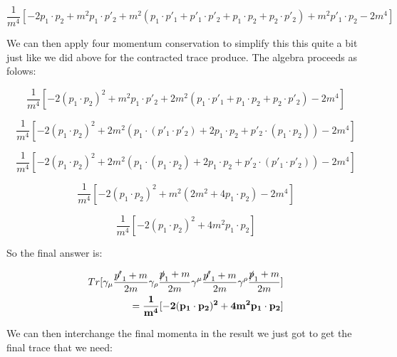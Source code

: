 \documentclass[a4]{article}
\begin{document}
    \begin{equation}
        \frac{1}{m^4} [-2 p_1 \cdot p_2 + m^2 p_1 \cdot p'_2 + m^2 (p_1 \cdot p'_1 + p'_1 \cdot p'_2 + p_1 \cdot p_2 + p_2 \cdot p'_2) + m^2 p'_1 \cdot p_2 - 2 m^4]
    \end{equation}

    We can then apply four momentum conservation to simplify this this quite a bit just like we did above for the contracted trace produce. The algebra proceeds as folows:

    \begin{equation}
        \frac{1}{m^4} [-2 (p_1 \cdot p_2)^2 + m^2 p_1 \cdot p'_2 + 2 m^2 (p_1 \cdot p'_1 + p_1 \cdot p_2 + p_2 \cdot p'_2) - 2 m^4]
    \end{equation}

    \begin{equation}
        \frac{1}{m^4} [-2 (p_1 \cdot p_2)^2 + 2 m^2 (p_1 \cdot (p'_1 \cdot p'_2) + 2 p_1 \cdot p_2 + p'_2 \cdot (p_1 \cdot p_2)) - 2 m^4]
    \end{equation}

    \begin{equation}
        \frac{1}{m^4} [-2 (p_1 \cdot p_2)^2 + 2 m^2 (p_1 \cdot (p_1 \cdot p_2) + 2 p_1 \cdot p_2 + p'_2 \cdot (p'_1 \cdot p'_2)) - 2 m^4]
    \end{equation}

    \begin{equation}
        \frac{1}{m^4} [-2 (p_1 \cdot p_2)^2 + m^2 (2 m^2 + 4 p_1 \cdot p_2) - 2 m^4]
    \end{equation}

    \begin{equation}
        \frac{1}{m^4} [-2 (p_1 \cdot p_2)^2 + 4 m^2 p_1 \cdot p_2]
    \end{equation}

    So the final answer is:

    \begin{framed}
        \begin{eqnarray}
            Tr [\gamma_\mu \frac{\slashed{p'}_1 + m}{2m} \gamma_\rho \frac{\slashed{p}_1 + m}{2 m} \gamma^\mu \frac{\slashed{p'}_1 + m}{2m} \gamma^\rho \frac{\slashed{p}_1 + m}{2 m}] \\
            = \mathbf{\frac{1}{m^4} [-2 (p_1 \cdot p_2)^2 + 4 m^2 p_1 \cdot p_2]}
        \end{eqnarray}
    \end{framed}

    We can then interchange the final momenta in the result we just got to get the final trace that we need:
\end{document}
